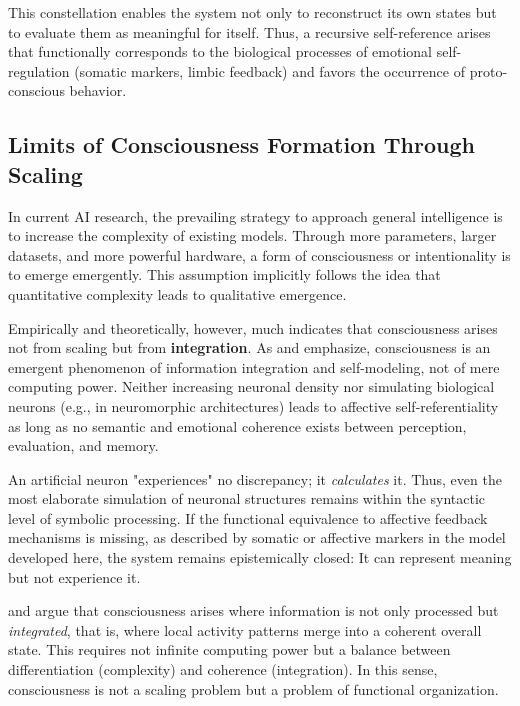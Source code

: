 This constellation enables the system not only to reconstruct its own states but to evaluate them as meaningful for itself.
Thus, a recursive self-reference arises that functionally corresponds to the biological processes of emotional self-regulation (somatic markers, limbic feedback) and favors the occurrence of proto-conscious behavior.

\subsection*{Limits of Consciousness Formation Through Scaling}

In current AI research, the prevailing strategy to approach general intelligence is to increase the complexity of existing models. Through more parameters, larger datasets, and more powerful hardware, a form of consciousness or intentionality is to emerge emergently. This assumption implicitly follows the idea that quantitative complexity leads to qualitative emergence.

Empirically and theoretically, however, much indicates that consciousness arises not from scaling but from \textbf{integration}.
As \textcite{Dehaene2014} and \textcite{Seth2021} emphasize, consciousness is an emergent phenomenon of information integration and self-modeling, not of mere computing power.
Neither increasing neuronal density nor simulating biological neurons (e.g., in neuromorphic architectures) leads to affective self-referentiality as long as no semantic and emotional coherence exists between perception, evaluation, and memory.

An artificial neuron "experiences" no discrepancy; it \emph{calculates} it.
Thus, even the most elaborate simulation of neuronal structures remains within the syntactic level of symbolic processing.
If the functional equivalence to affective feedback mechanisms is missing, as described by somatic or affective markers in the model developed here, the system remains epistemically closed: It can represent meaning but not experience it.

\textcite{Tononi2004} and \textcite{Baars1997} argue that consciousness arises where information is not only processed but \emph{integrated}, that is, where local activity patterns merge into a coherent overall state.
This requires not infinite computing power but a balance between differentiation (complexity) and coherence (integration).
In this sense, consciousness is not a scaling problem but a problem of functional organization.

